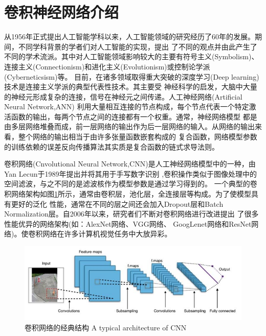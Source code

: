 \section{卷积神经网络介绍}
	从1956年正式提出人工智能学科以来，人工智能领域的研究经历了60年的发展。期间，不同学科背景的学者们对人工智能的实现，提出
	了不同的观点并由此产生了不同的学术流派。其中对人工智能领域影响较大的主要有符号主义(Symbolism)、
	连接主义(Connectionism)和进化主义(Evolutionism)或控制论学派(Cyberneticsism)等。
	目前，在诸多领域取得重大突破的深度学习(Deep learning)技术是连接主义学派的典型代表性技术。其主要受
	神经科学的启发，大脑中大量的神经元形成复杂的连接，信号在神经元之间传递。人工神经网络(Artificial Neural Network,ANN)
	利用大量相互连接的节点构成，每个节点代表一个特定激活函数的输出，每两个节点之间的连接都有一个权重。通常，神经网络模型
	都是由多层网络堆叠而成，前一层网络的输出作为后一层网络的输入。从网络的输出来看，整个网络的输出相当于由许多张量函数嵌套构成的
	复合函数，网络模型参数的训练依赖的误差反向传播算法其实质是复合函数的链式求导法则。
	
	卷积网络(Cnvolutional Neural Network,CNN)是人工神经网络模型中的一种，由Yan Lecun于1989年提出并将其用于手写数字识别
	\cite{le1989handwritten},卷积操作类似于图像处理中的空间滤波，与之不同的是滤波核作为模型参数是通过学习得到的。
	一个典型的卷积网络架构如图\ref{fig:chap4:cnn}所示，通常由卷积层，池化层，全连接层等构成。为了使模型具有更好的泛化
	性能，通常在不同的层之间还会加入Dropout层和Batch Normalization层。自2006年以来，研究者们不断对卷积网络进行改进提出
	了很多性能优异的网络架构(如：AlexNet网络\cite{krizhevsky2012imagenet}、VGG网络\cite{simonyan2014very}、
	GoogLenet网络\cite{szegedy2015going}和ResNet网络\cite{Kaiming2015Deep})。使卷积网络在许多计算机视觉任务中大放异彩。
	\begin{figure}[h]
	  \centering
	  \includegraphics[width=12cm]{figure/chap4/CNN-arch.png}
	  \bicaption
		{卷积网络的经典结构}
		{A typical architecture of CNN}
	  \label{fig:chap4:cnn}
	\end{figure}
